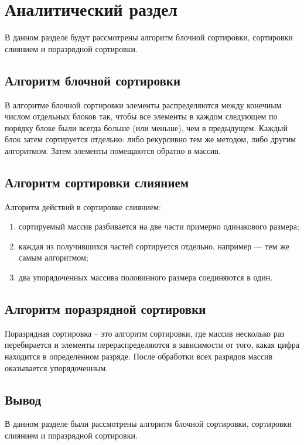 \chapter{Аналитический раздел}

В данном разделе будут рассмотрены алгоритм блочной сортировки, сортировки слиянием и поразрядной сортировки.

\section{Алгоритм блочной сортировки}

В алгоритме блочной сортировки элементы распределяются между конечным числом отдельных блоков так, чтобы все элементы в каждом следующем по порядку блоке были всегда больше (или меньше), чем в предыдущем. 
Каждый блок затем сортируется отдельно: либо рекурсивно тем же методом, либо другим алгоритмом. Затем элементы помещаются обратно в массив. 

\section{Алгоритм сортировки слиянием}

Алгоритм действий в сортировке слиянием:

\begin{enumerate}[label={\arabic*)}]
	\item сортируемый массив разбивается на две части примерно одинакового размера;
	\item каждая из получившихся частей сортируется отдельно, например — тем же самым алгоритмом;
	\item два упорядоченных массива половинного размера соединяются в один.
\end{enumerate}


\section{Алгоритм поразрядной сортировки}

Поразрядная сортировка \cite{radix} -- это алгоритм сортировки, где массив
несколько раз перебирается и элементы перераспределяются в зависимости от того, какая цифра находится в определённом разряде. 
После обработки всех разрядов массив оказывается упорядоченным. 

\section*{Вывод}

В данном разделе были рассмотрены алгоритм блочной сортировки, сортировки слиянием и поразрядной сортировки.
